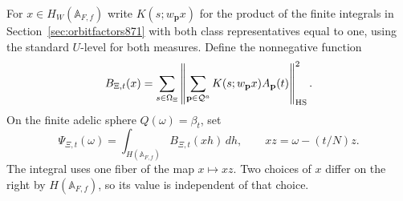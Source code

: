 \documentclass[a4paper,11pt]{article}
\theoremstyle{definition}
\theoremstyle{remark}
\numberwithin{equation}{section}
\begin{document}
For \(x\in H_W(\mathbb A_{F,f})\) write \(K(s;w_{\mathbf p}x)\)
for the product of the finite integrals in
Section~\ref{sec:orbitfactors871} with both class representatives
equal to one, using the standard \(U\)-level for both measures.
Define the nonnegative function
\[
       B_{\Xi,t}(x)=\sum_{s\in\Omega_\Xi}
          \left\|\sum_{\mathbf p\in\mathcal Q^a}
             K(s;w_{\mathbf p}x)A_{\mathbf p}(t)\right\|_{\rm HS}^2 .
\]
On the finite adelic sphere \(Q(\omega)=\beta_t\), set
\begin{equation}
    \Psi_{\Xi,t}(\omega)=\int_{H(\mathbb A_{F,f})}
                          B_{\Xi,t}(x h)\,dh,\qquad
               xz=\omega-(t/N)z .
 \label{eq:spheretest872}
\end{equation}
The integral uses one fiber of the map \(x\mapsto xz\).
Two choices of \(x\) differ on the right by \(H(\mathbb A_{F,f})\),
so its value is independent of that choice.
\end{document}
